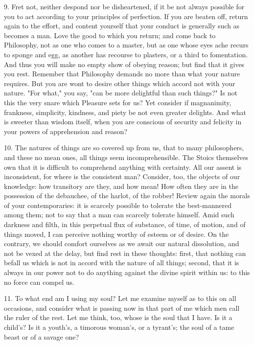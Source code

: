 \documentclass{book}
\begin{document}
9. Fret not, neither despond nor be disheartened, if it be not always
possible for you to act according to your principles of perfection. If
you are beaten off, return again to the effort, and content yourself
that your conduct is generally such as becomes a man. Love the good to
which you return; and come back to Philosophy, not as one who comes to
a master, but as one whose eyes ache recurs to sponge and egg, as
another has recourse to plasters, or a third to fomentation. And thus
you will make no empty show of obeying reason; but find that it gives
you rest. Remember that Philosophy demands no more than what your
nature requires. But you are wont to desire other things which accord
not with your nature. "For what," you say, "can be more delightful
than such things?" Is not this the very snare which Pleasure sets for
us? Yet consider if magnanimity, frankness, simplicity, kindness, and
piety be not even greater delights. And what is sweeter than wisdom
itself, when you are conscious of security and felicity in your powers
of apprehension and reason?

10. The natures of things are so covered up from us, that to many
philosophers, and these no mean ones, all things seem incomprehensible.
The Stoics themselves own that it is difficult to comprehend anything
with certainty. All our assent is inconsistent, for where is the
consistent man? Consider, too, the objects of our knowledge: how
transitory are they, and how mean! How often they are in the
possession of the debauchee, of the harlot, of the robber!  Review
again the morals of your contemporaries: it is scarcely possible to
tolerate the best-mannered among them; not to say that a man can
scarcely tolerate himself. Amid such darkness and filth, in this
perpetual flux of substance, of time, of motion, and of things moved,
I can perceive nothing worthy of esteem or of desire. On the contrary,
we should comfort ourselves as we await our natural dissolution, and
not be vexed at the delay, but find rest in these thoughts: first,
that nothing can befall us which is not in accord with the nature of
all things; second, that it is always in our power not to do anything
against the divine spirit within us: to this no force can compel us.

11. To what end am I using my soul? Let me examine myself as to this
on all occasions, and consider what is passing now in that part of me
which men call the ruler of the rest. Let me think, too, whose is the
soul that I have. Is it a child's? Is it a youth's, a timorous
woman's, or a tyrant's; the soul of a tame beast or of a savage one?
\end{document}
